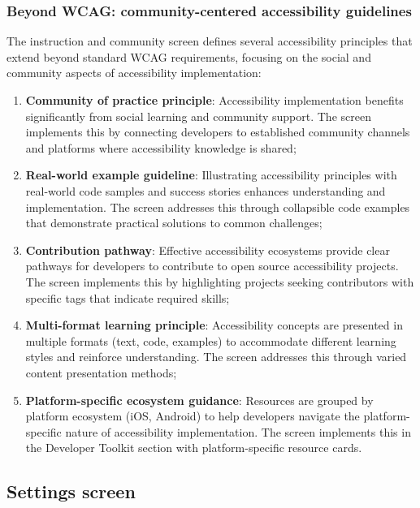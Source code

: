 \subsubsection{Beyond WCAG: community-centered accessibility guidelines}
\label{subsubsec:instruction-beyond-wcag}

The instruction and community screen defines several accessibility principles that extend beyond standard WCAG requirements, focusing on the social and community aspects of accessibility implementation:

\begin{enumerate}
    \item \textbf{Community of practice principle}: Accessibility implementation benefits significantly from social learning and community support. The screen implements this by connecting developers to established community channels and platforms where accessibility knowledge is shared;
    
    \item \textbf{Real-world example guideline}: Illustrating accessibility principles with real-world code samples and success stories enhances understanding and implementation. The screen addresses this through collapsible code examples that demonstrate practical solutions to common challenges;
    
    \item \textbf{Contribution pathway}: Effective accessibility ecosystems provide clear pathways for developers to contribute to open source accessibility projects. The screen implements this by highlighting projects seeking contributors with specific tags that indicate required skills;
    
    \item \textbf{Multi-format learning principle}: Accessibility concepts are presented in multiple formats (text, code, examples) to accommodate different learning styles and reinforce understanding. The screen addresses this through varied content presentation methods;
    
    \item \textbf{Platform-specific ecosystem guidance}: Resources are grouped by platform ecosystem (iOS, Android) to help developers navigate the platform-specific nature of accessibility implementation. The screen implements this in the Developer Toolkit section with platform-specific resource cards.
\end{enumerate}


\subsection{Settings screen}
\label{subsec:settings-screen}

